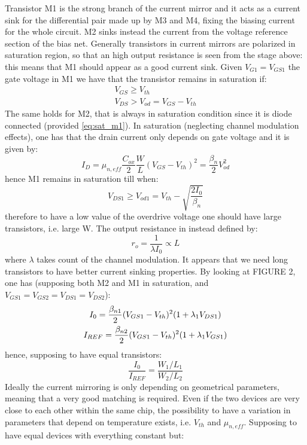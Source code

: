 Transistor M1 is the strong branch of the current mirror and it acts as a current sink for the differential pair made up by M3 and M4, fixing the biasing current for the whole circuit. M2 sinks instead the current from the voltage reference section of the bias net.
Generally transistors in current mirrors are polarized in saturation region, so that an high output resistance is seen from the stage above: this means that M1 should appear as a good current sink.
Given $V_{G1}=V_{GS1}$ the gate voltage in M1 we have that the transistor remains in saturation if:
\begin{gather}
\label{eq:sat_m1}
V_{GS}\geq V_{th}  \\
V_{DS}>V_{od} = V_{GS}-V_{th} 
\end{gather}
The same holds for M2, that is always in saturation condition since it is diode connected (provided \ref{eq:sat_m1}). In saturation (neglecting channel modulation effects), one has that the drain current only depends on gate voltage and it is given by:
\begin{equation}
\label{eq:Id_quadLaw}
I_D = \mu_{n,eff} \frac{C_{ox}}{2} \frac{W}{L} (V_{GS}-V_{th})^2 = \frac{\beta_{n}}{2}V_{od}^2
\end{equation}
hence M1 remains in saturation till when:
\begin{equation}
V_{DS1}\geq V_{od1}= V_{th}-\sqrt{\frac{2I_0}{\beta_{n}}}
\end{equation}
therefore to have a low value of the overdrive voltage one should have large transistors, i.e. large W.
The output resistance in instead defined by:
\begin{equation}
 r_o = \frac{1}{\lambda I_0} \propto L
\end{equation}
where $\lambda$ takes count of the channel modulation. It appears that we need long transistors to have better current sinking properties.
By looking at FIGURE 2, one has (supposing both M2 and M1 in saturation, and $V_{GS1}=V_{GS2}=V_{DS1}=V_{DS2}$):
\begin{gather}
I_0 = \frac{\beta_{n1}}{2}(V_{GS1}-V_{th})^2(1+\lambda_1V_{DS1}) \notag \\
I_{REF} = \frac{\beta_{n2}}{2}(V_{GS1}-V_{th})^2(1+\lambda_1V_{GS1}) \notag
\end{gather}
hence, supposing to have equal transistors:
\begin{equation}
\frac{I_0}{I_{REF}} = \frac{W_1/L_1}{W_2/L_2} 
\end{equation}
Ideally the current mirroring is only depending on geometrical parameters, meaning that a very good matching is required. Even if the two devices are very close to each other within the same chip, the possibility to have a variation in parameters that depend on temperature exists, i.e. $V_{th}$ and $\mu_{n,eff}$. Supposing to have equal devices with everything constant but:
